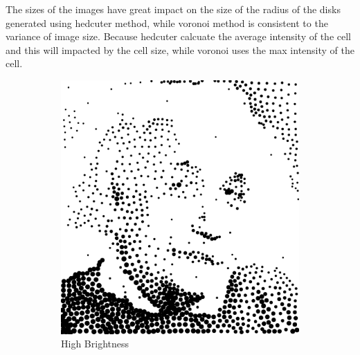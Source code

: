 \documentclass[11pt]{article}
\begin{document}
\begin{enumerate}
The sizes of the images have great impact on the size of the radius of the disks generated using  hedcuter method, while  voronoi method is consistent  to the variance of image size. Because hedcuter calcuate the average intensity of the cell and this will impacted by the cell size, while voronoi uses the max intensity of the cell.

\begin{figure}[H]
    \centering
        \begin{subfigure}{0.4\textwidth}
        \centering
        \includegraphics[width=\textwidth]{../results/hedcuter/3-3.pdf}
         \caption{High Brightness}
    \end{subfigure}
    \begin{subfigure}{0.4\textwidth}
        \centering

\end{subfigure}
\end{figure}
\end{enumerate}
\end{document}
